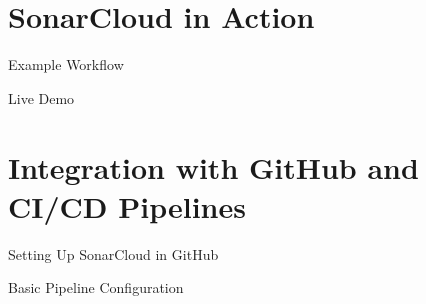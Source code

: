 \documentclass{beamer}
\begin{document}
\section[SonarCloud in Action]{SonarCloud in Action}

\begin{frame}{Example Workflow}

\end{frame}

\begin{frame}{Live Demo}
 
\end{frame}

\section[ Integration with GitHub and CI/CD Pipelines]{Integration with GitHub and CI/CD Pipelines}

\begin{frame}{Setting Up SonarCloud in GitHub}
 
\end{frame}

\begin{frame}{Basic Pipeline Configuration}
 
\end{frame}
\end{document}
